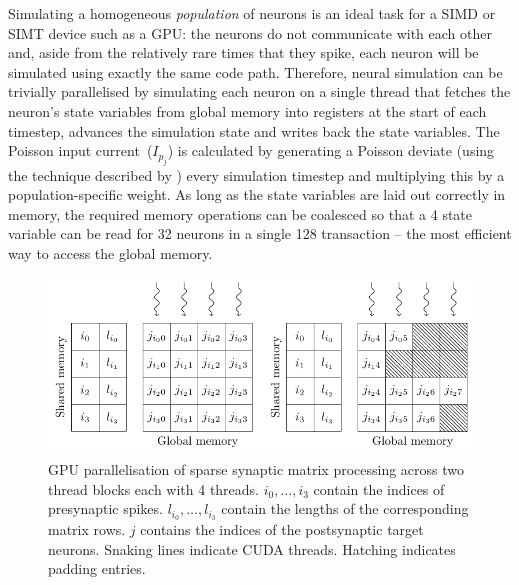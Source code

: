 \documentclass[utf8]{frontiersSCNS} %
\begin{document}
Simulating a homogeneous \textit{population} of neurons is an ideal task for a SIMD or SIMT device such as a GPU: the neurons do not communicate with each other and, aside from the relatively rare times that they spike, each neuron will be simulated using exactly the same code path.
Therefore, neural simulation can be trivially parallelised by simulating each neuron on a single thread that fetches the neuron's state variables from global memory into registers at the start of each timestep, advances the simulation state and writes back the state variables.
The Poisson input current~($I_{p_{j}}$) is calculated by generating a Poisson deviate (using the technique described by \citet[p504]{DevroyeLuc2013}) every simulation timestep and multiplying this by a population-specific weight.
As long as the state variables are laid out correctly in memory, the required memory operations can be coalesced so that a \SI{4}{\byte} state variable can be read for \num{32} neurons in a single \SI{128}{\byte} transaction -- the most efficient way to access the global memory.

\begin{figure}
    \begin{center}
        \includegraphics{figures/ragged_matrix}
    \end{center}
    \caption{GPU parallelisation of sparse synaptic matrix processing across two thread blocks each with \num{4} threads.
    $i_{0},\ldots,i_{3}$ contain the indices of presynaptic spikes.
    $l_{i_{0}},\ldots,l_{i_{3}}$ contain the lengths of the corresponding matrix rows.
    $j$ contains the indices of the postsynaptic target neurons.
    Snaking lines indicate CUDA threads.
    Hatching indicates padding entries.}
    \label{fig:ragged_matrix}
\end{figure}
\end{document}
